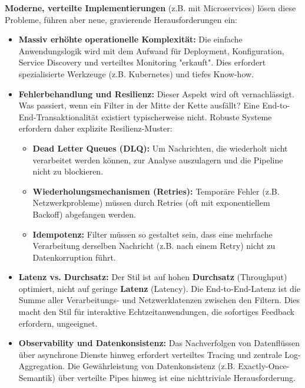 \documentclass[10pt,a4paper]{article}
\begin{document}
\textbf{Moderne, verteilte Implementierungen} (z.B. mit Microservices) lösen diese Probleme, führen aber neue, gravierende Herausforderungen ein:
\begin{itemize}
\item \textbf{Massiv erhöhte operationelle Komplexität:} Die einfache Anwendungslogik wird mit dem Aufwand für Deployment, Konfiguration, Service Discovery und verteiltes Monitoring "erkauft". Dies erfordert spezialisierte Werkzeuge (z.B. Kubernetes) und tiefes Know-how.\cite{richards2020}
\item \textbf{Fehlerbehandlung und Resilienz:} Dieser Aspekt wird oft vernachlässigt. Was passiert, wenn ein Filter in der Mitte der Kette ausfällt? Eine End-to-End-Transaktionalität existiert typischerweise nicht. Robuste Systeme erfordern daher explizite Resilienz-Muster:
    \begin{itemize}
        \item \textbf{Dead Letter Queues (DLQ):} Um Nachrichten, die wiederholt nicht verarbeitet werden können, zur Analyse auszulagern und die Pipeline nicht zu blockieren.
        \item \textbf{Wiederholungsmechanismen (Retries):} Temporäre Fehler (z.B. Netzwerkprobleme) müssen durch Retries (oft mit exponentiellem Backoff) abgefangen werden.
        \item \textbf{Idempotenz:} Filter müssen so gestaltet sein, dass eine mehrfache Verarbeitung derselben Nachricht (z.B. nach einem Retry) nicht zu Datenkorruption führt.
    \end{itemize}
\item \textbf{Latenz vs. Durchsatz:} Der Stil ist auf hohen \textbf{Durchsatz} (Throughput) optimiert, nicht auf geringe \textbf{Latenz} (Latency). Die End-to-End-Latenz ist die Summe aller Verarbeitungs- und Netzwerklatenzen zwischen den Filtern. Dies macht den Stil für interaktive Echtzeitanwendungen, die sofortiges Feedback erfordern, ungeeignet.\cite{uqcloud_pipeline}
\item \textbf{Observability und Datenkonsistenz:} Das Nachverfolgen von Datenflüssen über asynchrone Dienste hinweg erfordert verteiltes Tracing und zentrale Log-Aggregation. Die Gewährleistung von Datenkonsistenz (z.B. Exactly-Once-Semantik) über verteilte Pipes hinweg ist eine nichttriviale Herausforderung.\cite{richards2020}
\end{itemize}
\end{document}
